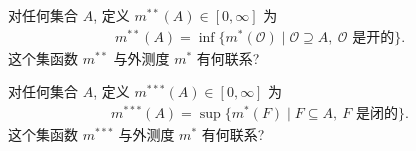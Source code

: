 \documentclass[../../main.tex]{subfiles}
\begin{document}
\begin{exercise}\label{exercise:ch02-22}
对任何集合 $A$, 定义 $m^{**}(A)\in[0,\infty]$ 为
\begin{align*}
m^{**}(A)=\inf\{m^{*}(\mathcal{O})\mid\mathcal{O}\supseteq A,\ \mathcal{O}\text{ 是开的}\}.
\end{align*}
这个集函数 $m^{**}$ 与外测度 $m^{*}$ 有何联系?
\end{exercise}

\begin{exercise}\label{exercise:ch02-23}
对任何集合 $A$, 定义 $m^{***}(A)\in[0,\infty]$ 为
\begin{align*}
m^{***}(A)=\sup\{m^{*}(F)\mid F\subseteq A,\ F\text{ 是闭的}\}.
\end{align*}
这个集函数 $m^{***}$ 与外测度 $m^{*}$ 有何联系?
\end{exercise}
\end{document}
